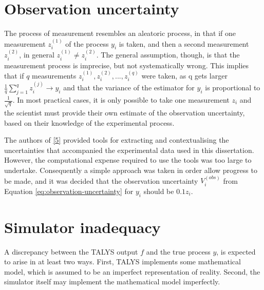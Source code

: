 \documentclass[
  12pt,
  a4paper,
  twoside]{book}
\begin{document}
\hypertarget{obs-unc}{%
\section{Observation uncertainty}\label{obs-unc}}

The process of measurement resembles an aleatoric process, in that if one measurement \(z_i^{(1)}\) of the process \(y_i\) is taken, and then a second measurement \(z_i^{(2)}\), in general \(z_i^{(1)} \neq z_i^{(2)}\). The general assumption, though, is that the measurement process is imprecise, but not systematically wrong. This implies that if \(q\) measurements \(z_i^{(1)},z_i^{(2)},...,z_i^{(q)}\) were taken, as q gets larger \(\frac{1}{q}\sum_{j=1}^q z_i^{(j)} \rightarrow y_i\) and that the variance of the estimator for \(y_i\) is proportional to \(\frac{1}{\sqrt{q}}\). In most practical cases, it is only possible to take one measurement \(z_i\) and the scientist must provide their own estimate of the observation uncertainty, based on their knowledge of the experimental process.

The authors of \protect\hyperlink{ref-Schnabel_2021}{{[}5{]}} provided tools for extracting and contextualising the uncertainties that accompanied the experimental data used in this dissertation. However, the computational expense required to use the tools was too large to undertake. Consequently a simple approach was taken in order allow progress to be made, and it was decided that the observation uncertainty \(V_i^{(obs)}\) from Equation \eqref{eq:observation-uncertainty} for \(y_i\) should be \(0.1z_i\).

\hypertarget{sim-ad}{%
\section{Simulator inadequacy}\label{sim-ad}}

A discrepancy between the TALYS output \(f\) and the true process \(y\), is expected to arise in at least two ways. First, TALYS implements some mathematical model, which is assumed to be an imperfect representation of reality. Second, the simulator itself may implement the mathematical model imperfectly.
\end{document}
